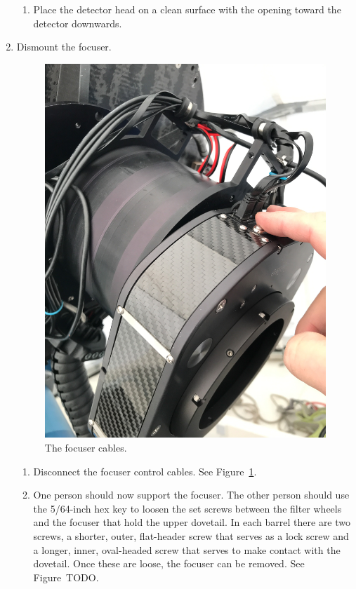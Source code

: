 \begin{enumerate}
\begin{enumerate}
  \item Place the detector head on a clean surface with the opening toward the detector downwards.
  
\end{enumerate}

\item Dismount the focuser.

\begin{figure}
\begin{center}
\includegraphics[angle=0,width=0.8\linewidth]{figures/huitzi-f20-focuser-cables}
\end{center}
\caption{The focuser cables.}
\label{figure:huitzi-f20-focuser-cables}
\end{figure}

\begin{enumerate}
  
  \item Disconnect the focuser control cables. See Figure~\ref{figure:huitzi-f20-focuser-cables}.

  \item One person should now support the focuser. The other person should use the 5/64-inch hex key to loosen the set screws between the filter wheels and the focuser that hold the upper dovetail. In each barrel there are two screws, a shorter, outer, flat-header screw that serves as a lock screw and a longer, inner, oval-headed screw that serves to make contact with the dovetail. Once these are loose, the focuser can be removed. See Figure~TODO.
  

\end{enumerate}
\end{enumerate}
